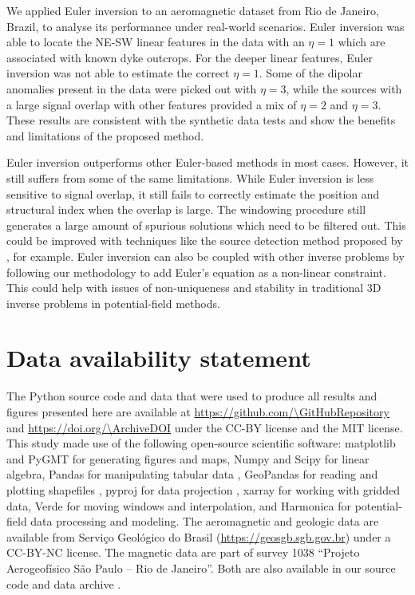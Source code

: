 We applied Euler inversion to an aeromagnetic dataset from Rio de Janeiro, Brazil, to analyse its performance under real-world scenarios.
Euler inversion was able to locate the NE-SW linear features in the data with an $\eta=1$ which are associated with known dyke outcrops.
For the deeper linear features, Euler inversion was not able to estimate the correct $\eta=1$.
Some of the dipolar anomalies present in the data were picked out with $\eta=3$, while the sources with a large signal overlap with other features provided a mix of $\eta=2$ and $\eta=3$.
These results are consistent with the synthetic data tests and show the benefits and limitations of the proposed method.

Euler inversion outperforms other Euler-based methods in most cases.
However, it still suffers from some of the same limitations.
While Euler inversion is less sensitive to signal overlap, it still fails to correctly estimate the position and structural index when the overlap is large.
The windowing procedure still generates a large amount of spurious solutions which need to be filtered out.
This could be improved with techniques like the source detection method proposed by \citet{Castro2020}, for example.
Euler inversion can also be coupled with other inverse problems by following our methodology to add Euler's equation as a non-linear constraint.
This could help with issues of non-uniqueness and stability in traditional 3D inverse problems in potential-field methods.

\section*{Data availability statement}

The Python source code and data that were used to produce all results and
figures presented here are available at
\url{https://github.com/\GitHubRepository}
and \url{https://doi.org/\ArchiveDOI} \citep{figshare}
under the CC-BY license and the MIT license.
This study made use of the following open-source scientific software:
matplotlib \citep{matplotlib} and PyGMT \citep{pygmt} for generating figures and maps,
Numpy \citep{numpy} and Scipy \citep{scipy} for linear algebra,
Pandas for manipulating tabular data \citep{McKinney2010,pandas},
GeoPandas for reading and plotting shapefiles \citep{geopandas},
pyproj for data projection \citep{pyproj},
xarray \citep{xarray} for working with gridded data,
Verde \citep{verde} for moving windows and interpolation,
and Harmonica \citep{harmonica} for potential-field data processing and modeling.
The aeromagnetic and geologic data are available from Serviço Geológico do Brasil
(\url{https://geosgb.sgb.gov.br}) under a CC-BY-NC license.
The magnetic data are part of survey 1038 ``Projeto Aerogeofísico São Paulo -- Rio de Janeiro''.
Both are also available in our source code and data archive \citep{figshare}.


